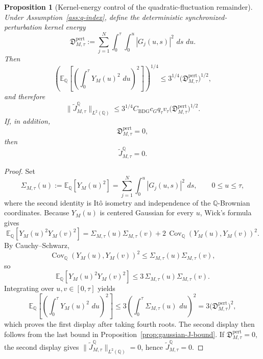 \documentclass[11pt,a4paper]{amsart}
\theoremstyle{plain}
\newtheorem{proposition}[theorem]{Proposition}
\theoremstyle{definition}
\theoremstyle{remark}
\DeclareMathOperator{\Cov}{Cov}
\newcommand{\QQ}{\mathbb{Q}}
\newcommand{\EE}{\mathbb{E}}
\newcommand{\dd}{\,d}
\begin{document}
\begin{proposition}[Kernel-energy control of the quadratic-fluctuation remainder]\label{prop:gaussian-J-kernel}
Under Assumption~\ref{ass:q-index}, define the deterministic synchronized-perturbation kernel
energy
\[
        \mathfrak D_{M,\tau}^{\mathrm{pert}}
        :=
        \sum_{j=1}^N \int_0^\tau \int_0^u
        |G_j(u,s)|^2\,\dd s\,\dd u.
\]
Then
\[
        \left(
                \EE_\QQ\!\left[
                        \left(
                                \int_0^\tau Y_M(u)^2\,\dd u
                        \right)^2
                \right]
        \right)^{1/4}
        \le
        3^{1/4}
        \bigl(\mathfrak D_{M,\tau}^{\mathrm{pert}}\bigr)^{1/2},
\]
and therefore
\[
        \|\widetilde J_{M,\tau}^\QQ\|_{L^2(\QQ)}
        \le
        3^{1/4} C_{\mathrm{BDG}} c_G q_\tau v_\tau
        \bigl(\mathfrak D_{M,\tau}^{\mathrm{pert}}\bigr)^{1/2}.
\]
If, in addition,
\[
        \mathfrak D_{M,\tau}^{\mathrm{pert}}=0,
\]
then
\[
        \widetilde J_{M,\tau}^\QQ=0.
\]
\end{proposition}

\begin{proof}
Set
\[
        \Sigma_{M,\tau}(u)
        :=
        \EE_\QQ[Y_M(u)^2]
        =
        \sum_{j=1}^N \int_0^u |G_j(u,s)|^2\,\dd s,
        \qquad
        0\le u\le \tau,
\]
where the second identity is It\^o isometry and independence of the \(\QQ\)-Brownian
coordinates.  Because \(Y_M(u)\) is centered Gaussian for every \(u\), Wick's formula gives
\[
        \EE_\QQ[Y_M(u)^2Y_M(v)^2]
        =
        \Sigma_{M,\tau}(u)\Sigma_{M,\tau}(v)
        +
        2\,\Cov_\QQ(Y_M(u),Y_M(v))^2.
\]
By Cauchy--Schwarz,
\[
        \Cov_\QQ(Y_M(u),Y_M(v))^2
        \le
        \Sigma_{M,\tau}(u)\Sigma_{M,\tau}(v),
\]
so
\[
        \EE_\QQ[Y_M(u)^2Y_M(v)^2]
        \le
        3\,\Sigma_{M,\tau}(u)\Sigma_{M,\tau}(v).
\]
Integrating over \(u,v\in[0,\tau]\) yields
\[
        \EE_\QQ\!\left[
                \left(
                        \int_0^\tau Y_M(u)^2\,\dd u
                \right)^2
        \right]
        \le
        3
        \left(
                \int_0^\tau \Sigma_{M,\tau}(u)\,\dd u
        \right)^2
        =
        3\bigl(\mathfrak D_{M,\tau}^{\mathrm{pert}}\bigr)^2,
\]
which proves the first display after taking fourth roots.  The second display then follows from
the last bound in Proposition~\ref{prop:gaussian-J-bound}.  If
\(\mathfrak D_{M,\tau}^{\mathrm{pert}}=0\), the second display gives
\(\|\widetilde J_{M,\tau}^\QQ\|_{L^2(\QQ)}=0\), hence \(\widetilde J_{M,\tau}^\QQ=0\).
\end{proof}
\end{document}
